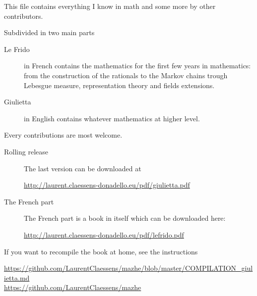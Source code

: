 
\thispagestyle{empty}

This file contains everything I know in math and some more by other contributors.

Subdivided in two main parts
\begin{description}
    \item[Le Frido] in French contains the mathematics for the first few years in mathematics: from the construction of the rationals to the Markov chains trough Lebesgue measure, representation theory and fields extensions.
    \item[Giulietta] in English contains whatever mathematics at higher level.
\end{description}

\begin{center}
    Every contributions are most welcome.
\end{center}

\vfill

\begin{description}
    \item[Rolling release]

        The last version can be downloaded at
        \begin{center}
            \url{http://laurent.claessens-donadello.eu/pdf/giulietta.pdf}
        \end{center}

    \item[The French part]
        The French part is a book in itself which can be downloaded here:
        \begin{center}
            \url{http://laurent.claessens-donadello.eu/pdf/lefrido.pdf}
        \end{center}

\end{description}

If you want to recompile the book at home, see the instructions
        \begin{center}
            \url{https://github.com/LaurentClaessens/mazhe/blob/master/COMPILATION_giulietta.md}\\
            \url{https://github.com/LaurentClaessens/mazhe}
        \end{center}

